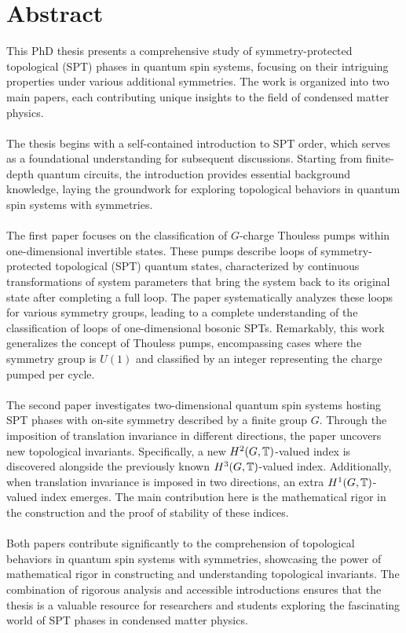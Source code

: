 \chapter{Abstract}                                 \label{ch:abstract}
This PhD thesis presents a comprehensive study of symmetry-protected topological (SPT) phases in quantum spin systems, focusing on their intriguing properties under various additional symmetries. The work is organized into two main papers, each contributing unique insights to the field of condensed matter physics.
\\\\
The thesis begins with a self-contained introduction to SPT order, which serves as a foundational understanding for subsequent discussions. Starting from finite-depth quantum circuits, the introduction provides essential background knowledge, laying the groundwork for exploring topological behaviors in quantum spin systems with symmetries.
\\\\
The first paper focuses on the classification of $G$-charge Thouless pumps within one-dimensional invertible states. These pumps describe loops of symmetry-protected topological (SPT) quantum states, characterized by continuous transformations of system parameters that bring the system back to its original state after completing a full loop. The paper systematically analyzes these loops for various symmetry groups, leading to a complete understanding of the classification of loops of one-dimensional bosonic SPTs. Remarkably, this work generalizes the concept of Thouless pumps, encompassing cases where the symmetry group is $U(1)$ and classified by an integer representing the charge pumped per cycle.
\\\\
The second paper investigates two-dimensional quantum spin systems hosting SPT phases with on-site symmetry described by a finite group $G$. Through the imposition of translation invariance in different directions, the paper uncovers new topological invariants. Specifically, a new $H^2(G,\mathbb T)$-valued index is discovered alongside the previously known $H^3(G,\mathbb T)$-valued index. Additionally, when translation invariance is imposed in two directions, an extra $H^1(G,\mathbb T)$-valued index emerges. The main contribution here is the mathematical rigor in the construction and the proof of stability of these indices.
\\\\
Both papers contribute significantly to the comprehension of topological behaviors in quantum spin systems with symmetries, showcasing the power of mathematical rigor in constructing and understanding topological invariants. The combination of rigorous analysis and accessible introductions ensures that the thesis is a valuable resource for researchers and students exploring the fascinating world of SPT phases in condensed matter physics.




\cleardoublepage

